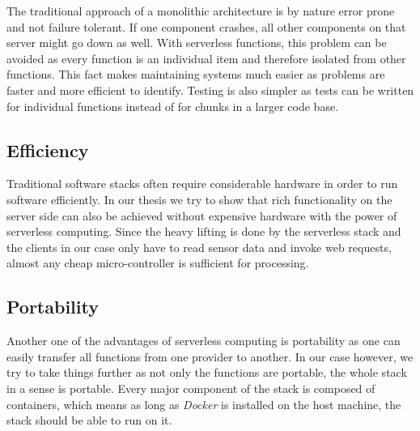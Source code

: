 The traditional approach of a monolithic architecture is by nature error prone and not failure
tolerant. If one component crashes, all other components on that server might go down as well. With
serverless functions, this problem can be avoided as every function is an individual item and
therefore isolated from other functions. This fact makes maintaining systems much easier as problems
are faster and more efficient to identify. Testing is also simpler as tests can be written for
individual functions instead of for chunks in a larger code base.

\subsection{Efficiency}

Traditional software stacks often require considerable hardware in order to run software
efficiently. In our thesis we try to show that rich functionality on the server side can also be
achieved without expensive hardware with the power of serverless computing. Since the heavy lifting
is done by the serverless stack and the clients in our case only have to read sensor data and invoke
web requests, almost any cheap micro-controller is sufficient for processing.

\subsection{Portability}

Another one of the advantages of serverless computing is portability as one can easily transfer all
functions from one provider to another. In our case however, we try to take things further as not
only the functions are portable, the whole stack in a sense is portable. Every major component of
the stack is composed of containers, which means as long as \textit{Docker} is installed on the host
machine, the stack should be able to run on it.
